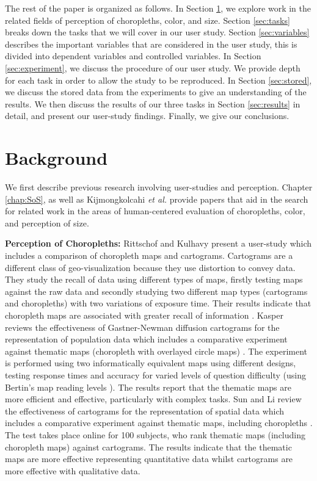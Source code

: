 The rest of the paper is organized as follows. In Section \ref{sec:related}, we explore work in the related fields of perception of choropleths, color, and size. Section \ref{sec:tasks} breaks down the tasks that we will cover in our user study. Section \ref{sec:variables} describes the important variables that are considered in the user study, this is divided into dependent variables and controlled variables. In Section \ref{sec:experiment}, we discuss the procedure of our user study. We provide depth for each task in order to allow the study to be reproduced. In Section \ref{sec:stored}, we discuss the stored data from the experiments to give an understanding of the results. We then discuss the results of our three tasks in Section \ref{sec:results} in detail, and present our user-study findings. Finally, we give our conclusions. 

\section{Background} \label{sec:related}
We first describe previous research involving user-studies and perception. Chapter \ref{chap:SoS}, as well as Kijmongkolcahi \textit{et al.} \cite{kijmongkolchai2017empirically} provide papers that aid in the search for related work in the areas of human-centered evaluation of choropleths, color, and perception of size.

\textbf{Perception of Choropleths: }
Rittschof and Kulhavy present a user-study which includes a comparison of choropleth maps and cartograms. Cartograms are a different class of geo-visualization because they use distortion to convey data. They study the recall of data using different types of maps, firstly testing maps against the raw data and secondly studying two different map types (cartograms and choropleths) with two variations of exposure time.  Their results indicate that choropleth maps are associated with greater recall of information \cite{rittschof1998learning}. Kasper reviews the effectiveness of Gastner-Newman diffusion cartograms \cite{gastner2004diffusion} for the representation of population data which includes a comparative experiment against thematic maps (choropleth with overlayed circle maps) \cite{kaspar2011empirical}. The experiment is performed using two informatically equivalent maps using different designs, testing response times and accuracy for varied levels of question difficulty (using Bertin's map reading levels \cite{bertin1983semiology}). The results report that the thematic maps are more efficient and effective, particularly with complex tasks. Sun and Li review the effectiveness of cartograms for the representation of spatial data which includes a comparative experiment against thematic maps, including choropleths \cite{sun2010effectiveness}. The test takes place online for 100 subjects, who rank thematic maps (including choropleth maps) against cartograms. The results indicate that the thematic maps are more effective representing quantitative data whilst cartograms are more effective with qualitative data.

